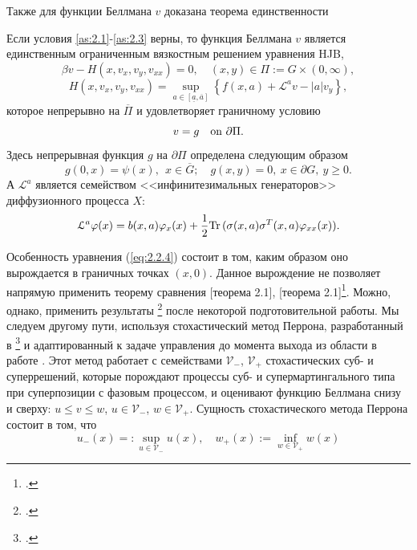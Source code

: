 \documentclass[twoside,12pt]{article}
\begin{document}
Также для функции Беллмана $v$ доказана теорема единственности
\begin{theorem} \label{th:2.1}
Если условия \ref{as:2.1}-\ref{as:2.3} верны, то функция Беллмана $v$ является единственным ограниченным вязкостным решением уравнения HJB,
\begin{equation} \label{eq:2.2.4}
\beta v- H(x,v_x,v_y,v_{xx})=0,\quad (x,y)\in \Pi:=G\times (0,\infty),
\end{equation}
$$H(x,v_x,v_y,v_{xx})=\sup_{a \in [\underline a, \overline a]} \left\{f(x,a)+ \mathcal L^a v-|a|v_y \right\},$$ которое непрерывно на $\overline\Pi$ и удовлетворяет граничному условию
\begin{equation} \label{eq:2.2.15}
v=g\quad \textnormal{on\ } \partial\Pi.
\end{equation}
Здесь непрерывная функция $g$ на $\partial\Pi$ определена следующим образом
$$ g(0,x)=\psi(x),\ \ x\in\overline G;\quad g(x,y)=0,\ x\in\partial G,\ y\ge 0. $$
А $\mathcal L^a$ является семейством <<инфинитезимальных генераторов>> диффузионного процесса $X$:
$$ \mathcal L^a\varphi(x)=b(x,a)\varphi_x(x)+ \frac{1}{2}{\rm Tr\,}(\sigma(x,a)\sigma^T(x,a)\varphi_{xx}(x)).$$
\end{theorem}
Особенность уравнения (\ref{eq:2.2.4}) состоит в том, каким образом оно вырождается в граничных точках $(x,0)$. Данное вырождение не позволяет напрямую применить теорему сравнения [теорема 2.1], [теорема 2.1]\footcite{Cha04}. Можно, однако, применить результаты \footcite{MotSar08a} после некоторой подготовительной работы. Мы следуем другому пути, используя стохастический метод Перрона, разработанный в \footcite{BaySir13} и адаптированный к задаче управления до момента выхода из области в работе . Этот метод работает с семействами $\mathcal V_-$, $\mathcal V_+$ стохастических суб- и суперрешений, которые порождают процессы суб- и супермартингального типа при суперпозиции с фазовым процессом, и оценивают функцию Беллмана снизу и сверху: $u\le v\le w$, $u\in\mathcal V_-$, $w\in\mathcal V_+$. Сущность стохастического метода Перрона состоит в том, что
$$ u_-(x)=:\sup_{u\in\mathcal V_-} u(x),\quad w_+(x):=\inf_{w\in\mathcal V_+} w(x)$$
\end{document}
